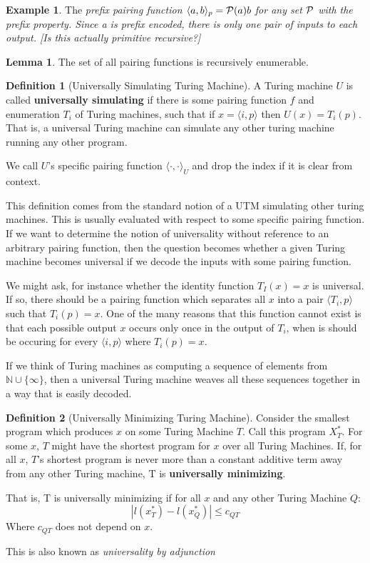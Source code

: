 \documentclass{article}
\theoremstyle{definition}
\newtheorem{lma}{Lemma}
\newtheorem*{dfn}{Definition}
\newtheorem*{exm}{Example}
\begin{document}
\begin{exm} The \em{prefix pairing function} $\langle a, b \rangle_p = {\cal P}(a)b$ for any set ${\cal P}$ with the prefix property. Since a is prefix encoded, there is only one pair of inputs to each output. [Is this actually primitive recursive?]
\end{exm}

\begin{lma}
The set of all pairing functions is recursively enumerable.
\end{lma}

\begin{dfn}[Universally Simulating Turing Machine]
A Turing machine $U$ is called \textbf{universally simulating} if there is some pairing function $f$ and enumeration ${T_i}$ of Turing machines, such that if $x = \langle i, p\rangle$ then $U(x) = T_i(p)$. That is, a universal Turing machine can simulate any other turing machine running any other program.
\end{dfn}

We call $U$'s specific pairing function $\langle \cdot, \cdot \rangle_U$ and drop the index if it is clear from context.

This definition comes from the standard notion of a UTM simulating other turing machines. This is usually evaluated with respect to some specific pairing function. If we want to determine the notion of universality without reference to an arbitrary pairing function, then the question becomes whether a given Turing machine becomes universal if we decode the inputs with some pairing function. 

We might ask, for instance whether the identity function $T_I(x) = x$ is universal. If so, there should be a pairing function which separates all $x$ into a pair $\langle T_i, p\rangle$ such that $T_i(p) = x$. One of the many reasons that this function cannot exist is that each possible output $x$ occurs only once in the output of $T_i$, when is should be occuring for every $\langle i, p\rangle$ where $T_i(p) = x$.

If we think of Turing machines as computing a sequence of elements from ${\mathbb N} \cup \{\infty\}$, then a universal Turing machine weaves all these sequences together in a way that is easily decoded. 

\begin{dfn}[Universally Minimizing Turing Machine]
Consider the smallest program which produces $x$ on some Turing Machine $T$. Call this program $X^*_T$. For some $x$, $T$ might have the shortest program for $x$ over all Turing Machines. If, for all $x$, $T$'s shortest program is never more than a constant additive term away from any other Turing machine, T is \textbf{universally minimizing}.

That is, T is universally minimizing if for all $x$ and any other Turing Machine $Q$:
\[
\left | l(x^*_T) - l(x^*_Q) \right | \leq c_{Q T}
\]
Where $c_{Q T}$ does not depend on $x$.

This is also known as \em{universality by adjunction}
\end{dfn}
\end{document}
